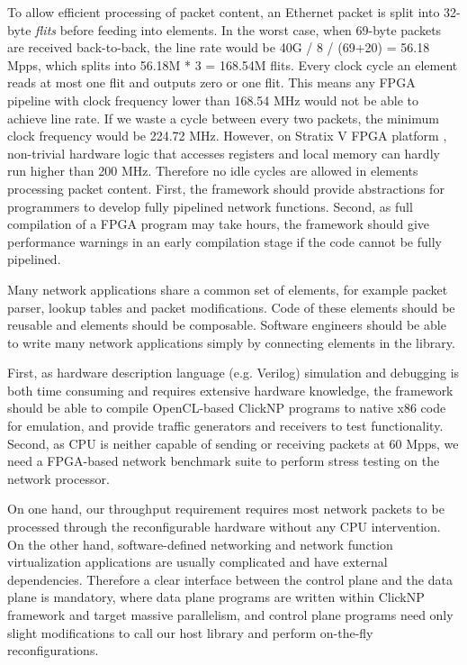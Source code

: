  To allow efficient processing of packet content, an Ethernet packet is split into 32-byte \textit{flits} before feeding into elements. In the worst case, when 69-byte packets are received back-to-back, the line rate would be 40G / 8 / (69+20) = 56.18 Mpps, which splits into 56.18M * 3 = 168.54M flits. Every clock cycle an element reads at most one flit and outputs zero or one flit. This means any FPGA pipeline with clock frequency lower than 168.54 MHz would not be able to achieve line rate. If we waste a cycle between every two packets, the minimum clock frequency would be 224.72 MHz. However, on Stratix V FPGA platform \cite{stratix2012device}, non-trivial hardware logic that accesses registers and local memory can hardly run higher than 200 MHz. Therefore no idle cycles are allowed in elements processing packet content. First, the framework should provide abstractions for programmers to develop fully pipelined network functions. Second, as full compilation of a FPGA program may take hours, the framework should give performance warnings in an early compilation stage if the code cannot be fully pipelined.

 Many network applications share a common set of elements, for example packet parser, lookup tables and packet modifications. Code of these elements should be reusable and elements should be composable. Software engineers should be able to write many network applications simply by connecting elements in the library.

 First, as hardware description language (e.g. Verilog) simulation and debugging is both time consuming and requires extensive hardware knowledge, the framework should be able to compile OpenCL-based ClickNP programs to native x86 code for emulation, and provide traffic generators and receivers to test functionality. Second, as CPU is neither capable of sending or receiving packets at 60 Mpps, we need a FPGA-based network benchmark suite to perform stress testing on the network processor.

 On one hand, our throughput requirement requires most network packets to be processed through the reconfigurable hardware without any CPU intervention. On the other hand, software-defined networking and network function virtualization applications are usually complicated and have external dependencies. Therefore a clear interface between the control plane and the data plane is mandatory, where data plane programs are written within ClickNP framework and target massive parallelism, and control plane programs need only slight modifications to call our host library and perform on-the-fly reconfigurations.

